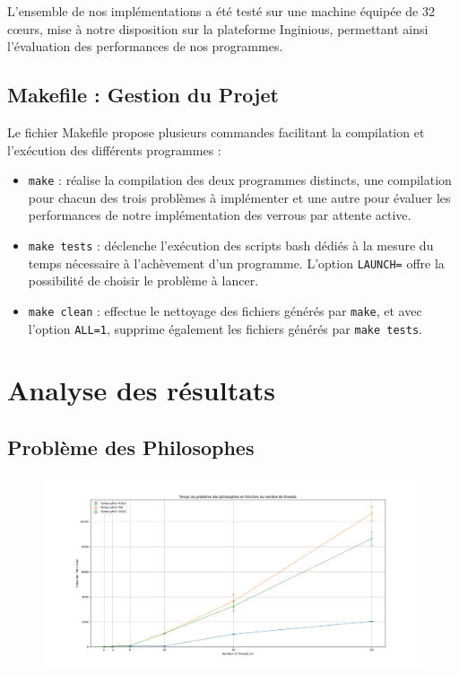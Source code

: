 \documentclass[12pt,titlepage]{article}
\begin{document}
L'ensemble de nos implémentations a été testé sur une machine équipée de 32 cœurs, mise à notre disposition sur la plateforme Inginious, permettant ainsi l'évaluation des performances de nos programmes.

\subsection{Makefile : Gestion du Projet}

Le fichier Makefile propose plusieurs commandes facilitant la compilation et l'exécution des différents programmes :

\begin{itemize}
    \item \texttt{make} : réalise la compilation des deux programmes distincts, une compilation pour chacun des trois problèmes à implémenter et une autre pour évaluer les performances de notre implémentation des verrous par attente active.
    \item \texttt{make tests} : déclenche l'exécution des scripts bash dédiés à la mesure du temps nécessaire à l'achèvement d'un programme. L'option \texttt{LAUNCH=} offre la possibilité de choisir le problème à lancer.
    \item \texttt{make clean} : effectue le nettoyage des fichiers générés par \texttt{make}, et avec l'option \texttt{ALL=1}, supprime également les fichiers générés par \texttt{make tests}.
\end{itemize}

\section{Analyse des résultats}

\subsection{Problème des Philosophes}

\begin{figure}[H]
\includegraphics[width=\textwidth, keepaspectratio]{Temps_philo.png}
\centering
\end{figure}
\end{document}
